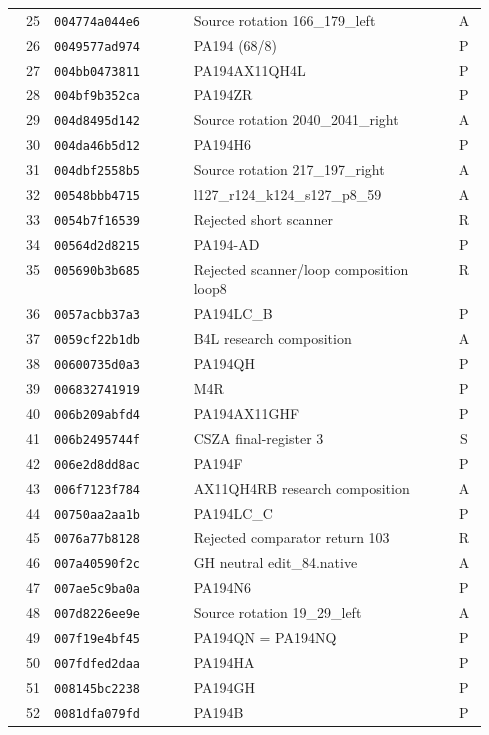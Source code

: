 \begin{longtable}{@{}r l p{0.55\linewidth} c@{}}
25 & \texttt{004774a044e6} & Source rotation 166\_179\_left & A \\
26 & \texttt{0049577ad974} & PA194 (68/8) & P \\
27 & \texttt{004bb0473811} & PA194AX11QH4L & P \\
28 & \texttt{004bf9b352ca} & PA194ZR & P \\
29 & \texttt{004d8495d142} & Source rotation 2040\_2041\_right & A \\
30 & \texttt{004da46b5d12} & PA194H6 & P \\
31 & \texttt{004dbf2558b5} & Source rotation 217\_197\_right & A \\
32 & \texttt{00548bbb4715} & l127\_r124\_k124\_s127\_p8\_59 & A \\
33 & \texttt{0054b7f16539} & Rejected short scanner & R \\
34 & \texttt{00564d2d8215} & PA194-AD & P \\
35 & \texttt{005690b3b685} & Rejected scanner/loop composition loop8 & R \\
36 & \texttt{0057acbb37a3} & PA194LC\_B & P \\
37 & \texttt{0059cf22b1db} & B4L research composition & A \\
38 & \texttt{00600735d0a3} & PA194QH & P \\
39 & \texttt{006832741919} & M4R & P \\
40 & \texttt{006b209abfd4} & PA194AX11GHF & P \\
41 & \texttt{006b2495744f} & CSZA final-register 3 & S \\
42 & \texttt{006e2d8dd8ac} & PA194F & P \\
43 & \texttt{006f7123f784} & AX11QH4RB research composition & A \\
44 & \texttt{00750aa2aa1b} & PA194LC\_C & P \\
45 & \texttt{0076a77b8128} & Rejected comparator return 103 & R \\
46 & \texttt{007a40590f2c} & GH neutral edit\_84.native & A \\
47 & \texttt{007ae5c9ba0a} & PA194N6 & P \\
48 & \texttt{007d8226ee9e} & Source rotation 19\_29\_left & A \\
49 & \texttt{007f19e4bf45} & PA194QN = PA194NQ & P \\
50 & \texttt{007fdfed2daa} & PA194HA & P \\
51 & \texttt{008145bc2238} & PA194GH & P \\
52 & \texttt{0081dfa079fd} & PA194B & P \\

\end{longtable}
